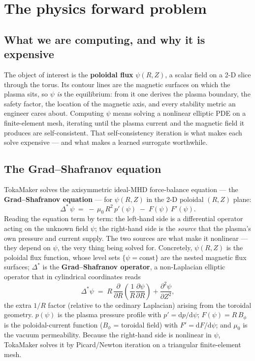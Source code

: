 \documentclass[11pt]{article}
\newcommand{\Lstar}{\Delta^{\!*}}
\begin{document}
\section{The physics forward problem}

\subsection{What we are computing, and why it is expensive}
The object of interest is the \textbf{poloidal flux} $\psi(R,Z)$, a scalar field on a 2-D slice
through the torus. Its contour lines are the magnetic surfaces on which the plasma sits, so $\psi$
\emph{is} the equilibrium: from it one derives the plasma boundary, the safety factor, the
location of the magnetic axis, and every stability metric an engineer cares about. Computing
$\psi$ means solving a nonlinear elliptic PDE on a finite-element mesh, iterating until the plasma
current and the magnetic field it produces are self-consistent. That self-consistency iteration is
what makes each solve expensive --- and what makes a learned surrogate worthwhile.

\subsection{The Grad--Shafranov equation}
TokaMaker solves the axisymmetric ideal-MHD force-balance equation --- the \textbf{Grad--Shafranov
equation} --- for $\psi(R,Z)$ in the 2-D poloidal $(R,Z)$ plane:
\begin{equation}
\Lstar\,\psi \;=\; -\,\mu_0\, R^2\, p'(\psi) \;-\; F(\psi)\,F'(\psi).
\end{equation}
Reading the equation term by term: the left-hand side is a differential operator acting on the
unknown field $\psi$; the right-hand side is the \emph{source} that the plasma's own pressure and
current supply. The two sources are what make it nonlinear --- they depend on $\psi$, the very
thing being solved for. Concretely, $\psi(R,Z)$ is the poloidal flux function, whose level sets
$\{\psi=\text{const}\}$ are the nested magnetic flux surfaces; $\Lstar$ is the \textbf{Grad--Shafranov
operator}, a non-Laplacian elliptic operator that in cylindrical coordinates reads
\begin{equation}
\Lstar\psi \;=\; R\,\frac{\partial}{\partial R}\!\left(\frac{1}{R}\frac{\partial \psi}{\partial R}\right) + \frac{\partial^2 \psi}{\partial Z^2},
\end{equation}
the extra $1/R$ factor (relative to the ordinary Laplacian) arising from the toroidal geometry.
$p(\psi)$ is the plasma pressure profile with $p'=\mathrm{d}p/\mathrm{d}\psi$; $F(\psi)=R\,B_\phi$
is the poloidal-current function ($B_\phi$ = toroidal field) with $F'=\mathrm{d}F/\mathrm{d}\psi$;
and $\mu_0$ is the vacuum permeability. Because the right-hand side is nonlinear in $\psi$,
TokaMaker solves it by Picard/Newton iteration on a triangular finite-element mesh.
\end{document}
